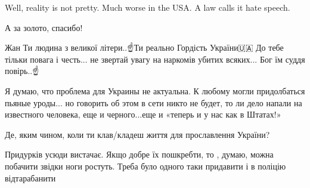 \begin{itemize}
 
Well, reality is not pretty. Much worse in the USA. A law calls it hate speech.

 

А за золото, спасибо!

 

Жан Ти людина з великої літери..☝Ти реально Гордість України🇺🇦 До тебе тільки
повага і честь... не звертай увагу на наркомів убитих всяких... Бог їм суддя
повірь..☝


 

Я думаю, что проблема для Украины не актуальна. К любому могли придолбаться
пьяные уроды... но говорить об этом в сети никто не будет, то ли дело напали на
известного человека, еще и черного...еще и «теперь и у нас как в Штатах!»


 
Де, яким чином, коли ти клав/кладеш життя для прославлення України?

 

Придурків усюди вистачає. Якщо добре їх пошкребти, то , думаю, можна побачити
звідки ноги ростуть. Треба було одного таки придавити і в поліцію відтарабанити



\end{itemize}
